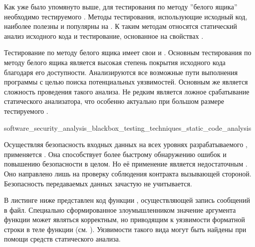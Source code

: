 %
Как уже было упомянуто выше, для тестирования  по методу ''белого ящика'' необходимо  тестируемого . 
%
Методы тестирования, использующие исходный код, наиболее полезны и популярны на . 
%
К таким методам относятся статический анализ исходного кода и тестирование, основанное на свойствах .

%
Тестирование по методу белого ящика имеет свои  и  . 
%
Основным  тестирования по методу белого ящика является высокая степень покрытия исходного кода благодаря его доступности. 
%
Анализируются все возможные пути выполнения программы с целью поиска потенциальных уязвимостей. 
%
Основным же  является сложность проведения такого анализа. 
%
Не редким является ложное срабатывание статического анализатора, что особенно актуально при большом размере тестируемого .


	{software_security_analysis_blackbox_testing_techniques_static_code_analysis}

%
Осуществляя безопасность входных данных на всех уровнях разрабатываемого , применяется . 
%
Она способствует более быстрому обнаружению ошибок и повышению безопасности  в целом. 
%
Но её применение является недостаточным . 
%
Оно направлено лишь на проверку соблюдения контракта вызывающей стороной. 
%
Безопасность передаваемых данных зачастую не учитывается. 

%
В листинге ниже представлен код функции , осуществляющей запись сообщений в файл. 
%
Специально сформированное злоумышленником значение аргумента функции  может являться корректным, но приводящим к уязвимости форматной строки  в теле функции (см. ). 
%
Уязвимости такого вида могут быть найдены при помощи средств статического анализа.

